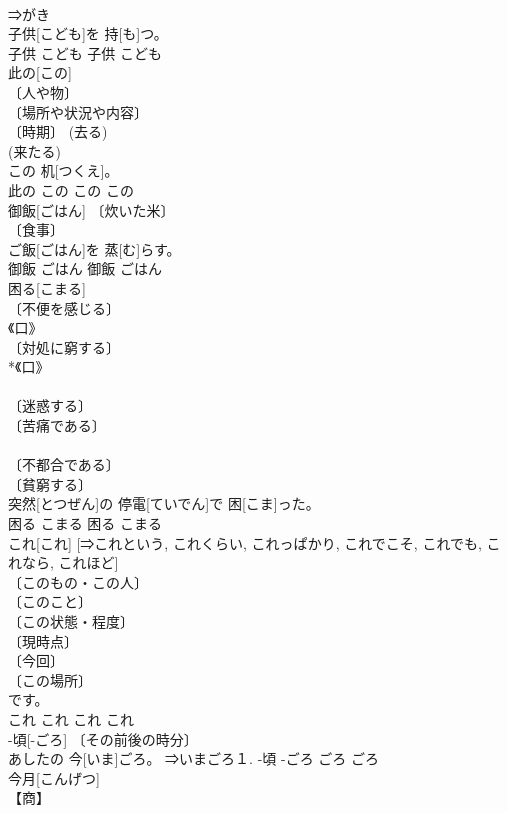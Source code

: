 \documentclass[8pt]{extreport}
\begin{document}
\begin{CJK}{UTF8}{min}
\\	⇒がき 
\\	子供[こども]を 持[も]つ。	
\\	子供	こども	子供	こども	
\\	此の[この]	
\\	〔人や物〕 
\\	〔場所や状況や内容〕 
\\	〔時期〕 (去る) 
\\	(来たる) 
\\	この 机[つくえ]。	
\\	此の	この	この	この	
\\	御飯[ごはん]	〔炊いた米〕 
\\	〔食事〕 
\\	[＝めし２]	ご飯[ごはん]を 蒸[む]らす。	
\\	御飯	ごはん	御飯	ごはん	
\\	困る[こまる]	
\\	〔不便を感じる〕 
\\	《口》 
\\	〔対処に窮する〕 
\\	*《口》 
\\	[⇒こまった] 
\\	〔迷惑する〕 
\\	〔苦痛である〕 
\\	[⇒こまった] 
\\	〔不都合である〕 
\\	〔貧窮する〕 
\\	突然[とつぜん]の 停電[ていでん]で 困[こま]った。	
\\	困る	こまる	困る	こまる	
\\	これ[これ]	[⇒これという, これくらい, これっぱかり, これでこそ, これでも, これなら, これほど] 
\\	〔このもの・この人〕 
\\	〔このこと〕 
\\	〔この状態・程度〕 
\\	〔現時点〕 
\\	〔今回〕 
\\	〔この場所〕 
\\	[⇒ここ２ 
\\	これが 次女[じじょ]です。	
\\	これ	これ	これ	これ	
\\	-頃[-ごろ]	〔その前後の時分〕 
\\	あしたの 今[いま]ごろ。	⇒いまごろ１.	-頃	-ごろ	ごろ	ごろ	
\\	今月[こんげつ]	
\\	【商】 

\end{CJK}
\end{document}
